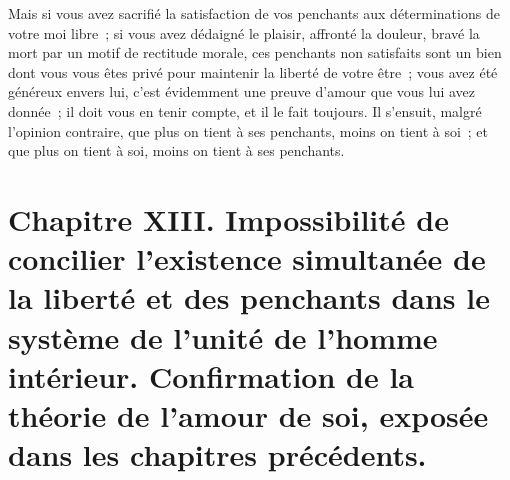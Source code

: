 \documentclass[french,twoside]{book} %
\newcommand\chapteropen{} %
\newcommand\chapterclose{} %
\begin{document}
Mais si vous avez sacrifié la satisfaction de vos penchants aux déterminations de votre moi libre ; si vous avez dédaigné le plaisir, affronté la douleur, bravé la mort par un motif de rectitude morale, ces penchants non satisfaits sont un bien dont vous vous êtes privé pour maintenir la liberté de votre être ; vous avez été généreux envers lui, c’est évidemment une preuve d’amour que vous lui avez donnée ; il doit vous en tenir compte, et il le fait toujours. Il s’ensuit, malgré l’opinion contraire, que plus on tient à ses penchants, moins on tient à soi ; et que plus on tient à soi, moins on tient à ses penchants.
\chapterclose


\chapteropen
\chapter[{Chapitre XIII. Impossibilité de concilier l’existence simultanée de la liberté et des penchants dans le système de l’unité de l’homme intérieur. Confirmation de la théorie de l’amour de soi, exposée dans les chapitres précédents.}]{Chapitre XIII. Impossibilité de concilier l’existence simultanée de la liberté et des penchants dans le système de l’unité de l’homme intérieur. Confirmation de la théorie de l’amour de soi, exposée dans les chapitres précédents.}\renewcommand{\leftmark}{Chapitre XIII. Impossibilité de concilier l’existence simultanée de la liberté et des penchants dans le système de l’unité de l’homme intérieur. Confirmation de la théorie de l’amour de soi, exposée dans les chapitres précédents.}
\end{document}
